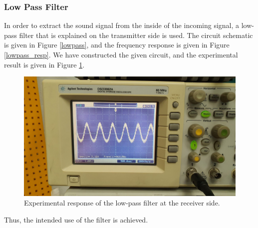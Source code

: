\documentclass[a4paper,10pt]{IEEEtran}
\begin{document}
\subsubsection{Low Pass Filter}
In order to extract the sound signal from the inside of the incoming signal, a low-pass filter that is explained on the transmitter side is used. The circuit schematic is given in Figure \ref{lowpass}, and the frequency response is given in Figure \ref{lowpass_resp}. We have constructed the given circuit, and the experimental result is given in Figure \ref{lowpass_osc}.
\begin{figure}[htbp!]
    \centering
    \includegraphics[width = 1\linewidth]{receiver_lowpass_experimental.jpeg}
    \caption{Experimental response of the low-pass filter at the receiver side. }
    \label{lowpass_osc}
\end{figure} 
Thus, the intended use of the filter is achieved.
\end{document}
